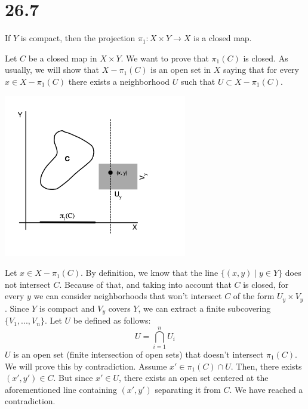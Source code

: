 \documentclass{article}
\begin{document}
    \section*{26.7}
    \begin{tcolorbox}[title=Statement]
        If $Y$ is compact, then the projection $\pi_1\colon X \times Y \to X$ is a closed map.
    \end{tcolorbox}
    \noindent
    Let $C$ be a closed map in $X \times Y$. We want to prove that $\pi_1(C)$ is closed. As usually, we will show that $X - \pi_1(C)$ is an open set in $X$ saying that for every $x \in X - \pi_1(C)$ there exists a neighborhood $U$ such that $U \subset X - \pi_1(C)$. 
    \begin{center}
        \includegraphics[width=0.6\textwidth]{diagram1.png}
    \end{center}
    Let $x \in X - \pi_1(C)$. By definition, we know that the line $\{(x, y) \mid y \in Y\}$ does not intersect $C$. Because of that, and taking into account that $C$ is closed, for every $y$ we can consider neighborhoods that won't intersect $C$ of the form $U_y \times V_y$. Since $Y$ is compact and $V_y$ covers $Y$, we can extract a finite subcovering $\{V_1, ..., V_n\}$. Let $U$ be defined as follows:
    \begin{equation*}
        U = \bigcap_{i=1}^{n}{U_i}
    \end{equation*}
    $U$ is an open set (finite intersection of open sets) that doesn't intersect $\pi_1(C)$. We will prove this by contradiction. Assume $x' \in \pi_1(C) \cap U$. Then, there exists $(x', y') \in C$. But since $x' \in U$, there exists an open set centered at the aforementioned line containing $(x', y')$ separating it from $C$. We have reached a contradiction.
    
\end{document}
